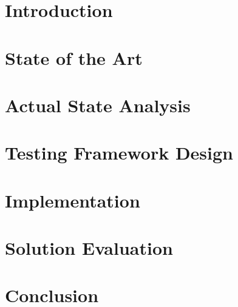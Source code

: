 	\chapter{Introduction}
		\label{chap:introduction}
		

	\newpage \clearpage \thispagestyle{empty} \null
			
	\chapter{State of the Art}
		\label{chap:theoretical-backgrounds}
		

	\chapter{Actual State Analysis}
		\label{chap:actual-state-analysis}
				

	\chapter{Testing Framework Design}
		\label{chap:testing-framework}
		
		\newpage \clearpage \thispagestyle{empty} \null
	\chapter{Implementation}
		\label{chap:implementation}
		
		\newpage \clearpage \thispagestyle{empty} \null
	\chapter{Solution Evaluation}
		\label{chap:solution-evaluation}
		
		
	\chapter{Conclusion}
		\label{chap:conclusion}
		
		
	\newpage \clearpage \thispagestyle{empty} \null
		

